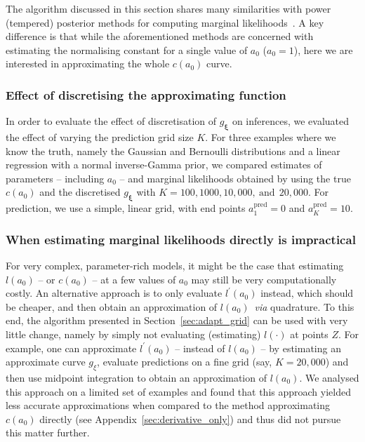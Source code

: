 \documentclass[a4paper, notitlepage, 11pt]{article}
\begin{document}
 The algorithm discussed in this section shares many similarities with power (tempered) posterior methods for computing marginal likelihoods~\citep{Friel2008}.
 A key difference is that while the aforementioned methods are concerned with estimating the normalising constant for a single value of $a_0$ ($a_0 = 1$), here we are interested in approximating the whole $c(a_0)$ curve.

\subsubsection{Effect of discretising the approximating function}
\label{sec:discretisation_error}

In order to evaluate the effect of discretisation of $g_{\boldsymbol\xi}$ on inferences, we evaluated the effect of varying the prediction grid size $K$.
For three examples where we know the truth, namely the Gaussian and Bernoulli distributions and a linear regression with a normal inverse-Gamma prior, we compared estimates of parameters -- including $a_0$ -- and marginal likelihoods obtained by using the true $c(a_0)$ and the discretised $g_{\boldsymbol\xi}$ with $K =  100, 1000, 10, 000,~\text{and}~\: 20, 000$.
For prediction, we use a simple, linear grid, with end points $a^{\text{pred}}_1 = 0$ and $a^{\text{pred}}_K = 10$.

\subsubsection{When estimating marginal likelihoods directly is impractical}
\label{sec:adapt_grid_derivOnly}

For very complex, parameter-rich models, it might be the case that estimating $l(a_0)$ -- or $c(a_0)$ -- at a few values of $a_0$ may still be very computationally costly.
An alternative approach is to only evaluate $l^\prime(a_0)$ instead, which should be cheaper, and then obtain an approximation of $l(a_0)$~\textit{via} quadrature.
To this end, the algorithm presented in Section~\ref{sec:adapt_grid} can be used with very little change, namely by simply not evaluating (estimating) $l(\cdot)$ at points $Z$.
For example, one can approximate $l^\prime(a_0)$ -- instead of $l(a_0)$ -- by estimating an approximate curve $g_\xi$, evaluate predictions on a fine grid (say, $K = 20, 000$) and then use midpoint integration to obtain an approximation of $l(a_0)$.
We analysed this approach on a limited set of examples and found that this approach yielded less accurate approximations when compared to the method approximating $c(a_0)$ directly (see Appendix~\ref{sec:derivative_only})  and thus did not pursue this matter further.
\end{document}
